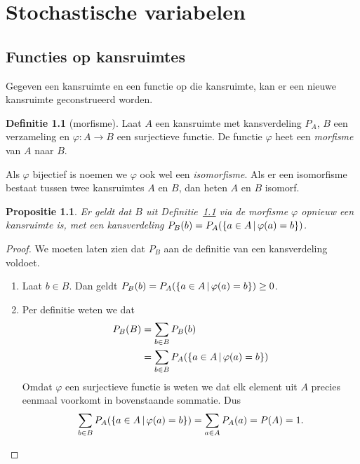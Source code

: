 \documentclass[a4paper]{book}
\newtheorem{proposition}[theorem]{Propositie}
\theoremstyle{definition}
\newtheorem{definition}[theorem]{Definitie}
\begin{document}
\chapter{Stochastische variabelen}


\section{Functies op kansruimtes}
Gegeven een kansruimte en een functie op die kansruimte, kan er een nieuwe kansruimte geconstrueerd worden.

\begin{definition}[morfisme]\label{morfisme}
    Laat $A$ een kansruimte met kansverdeling $P_A$, $B$ een verzameling en $\varphi : A \to B$ een surjectieve functie.
    De functie $\varphi$ heet een \emph{morfisme} van $A$ naar $B$.

    Als $\varphi$ bijectief is noemen we $\varphi$ ook wel een \emph{isomorfisme}.
    Als er een isomorfisme bestaat tussen twee kansruimtes $A$ en $B$, dan heten $A$ en $B$ isomorf.
\end{definition}

\begin{proposition}
    Er geldt dat $B$ uit Definitie~\ref{morfisme} via de morfisme $\varphi$ opnieuw een kansruimte is,
    met een kansverdeling $P_B(b) = P_A(\set{a \in A}{\varphi(a) = b})$.
\end{proposition}
\begin{proof}
    We moeten laten zien dat $P_B$ aan de definitie van een kansverdeling voldoet.

    \begin{enumerate}[i]
        \item Laat $b \in B$. Dan geldt $P_B(b) =  P_A(\set{a \in A}{\varphi(a) = b}) \geq 0$.
        \item Per definitie weten we dat
        \begin{align*}
            P_B(B) &= \sum_{b \in B} P_B(b) \\
                   &= \sum_{b \in B} P_A(\set{a \in A}{\varphi(a) = b}) \\
        \end{align*}
        Omdat $\varphi$ een surjectieve functie is weten we dat elk element uit $A$ precies eenmaal voorkomt in bovenstaande sommatie.
        Dus \[ \sum_{b \in B} P_A(\set{a \in A}{\varphi(a) = b}) = \sum_{a \in A} P_A(a) = P(A) = 1. \]
    \end{enumerate}
\end{proof}
\end{document}
